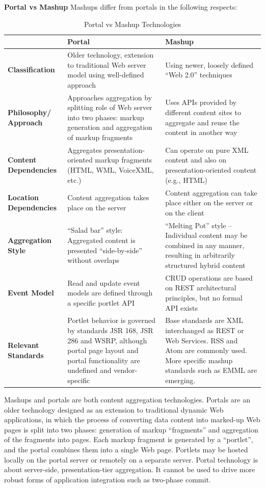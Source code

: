         \textbf{Portal vs Mashup}
		\newline
		Mashups differ from portals in the following respects:
		\begin{table}[H]
		\centering
		\begin{tabular}{|L{3cm}|L{5,5cm}|L{6cm}|}
		\hline
				                       & \textbf{Portal} & \textbf{Mashup} \\
		\hline 
		\textbf{Classification}   & Older technology, extension to traditional Web server model using well-defined approach & Using newer, loosely defined ``Web 2.0'' techniques \\
		\hline
		\textbf{Philosophy/ Approach}       & Approaches aggregation by splitting role of Web server into two phases: markup generation and aggregation of markup fragments & Uses APIs provided by different content sites to aggregate and reuse the content in another way \\
		\hline
		\textbf{Content Dependencies}	   & Aggregates presentation-oriented markup fragments (HTML, WML, VoiceXML, etc.) & Can operate on pure XML content and also on presentation-oriented content (e.g., HTML) \\
		\hline
		\textbf{Location Dependencies}  & Content aggregation takes place on the server & Content aggregation can take place either on the server or on the client \\
		\hline
		\textbf{Aggregation Style}		   & ``Salad bar'' style: Aggregated content is presented ``side-by-side'' without overlaps & ``Melting Pot'' style – Individual content may be combined in any manner, resulting in arbitrarily structured hybrid content \\
		\hline
		\textbf{Event Model}		       & Read and update event models are defined through a specific portlet API & CRUD operations are based on REST architectural principles, but no formal API exists \\
		\hline
		\textbf{Relevant Standards}		   & Portlet behavior is governed by standards JSR 168, JSR 286 and WSRP, although portal page layout and portal functionality are undefined and vendor-specific & Base standards are XML interchanged as REST or Web Services. RSS and Atom are commonly used. More specific mashup standards such as EMML are emerging. \\
		\hline
		\end{tabular}
		\caption[Portal vs Mashup Technology]{Portal vs Mashup Technologies}
		\label{tab:Portal_Mashup}
		\end{table}
		Mashups and portals are both content aggregation technologies. Portals are an older technology designed as an extension to traditional dynamic Web applications, in which the process of converting data content into marked-up Web pages is split into two phases: generation of markup ``fragments'' and aggregation of the fragments into pages. Each markup fragment is generated by a ``portlet'', and the portal combines them into a single Web page. Portlets may be hosted locally on the portal server or remotely on a separate server. 		Portal technology is about server-side, presentation-tier aggregation. It cannot be used to drive more robust forms of application integration such as two-phase commit.
		
